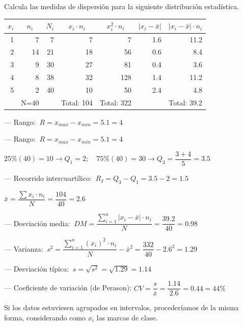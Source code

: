 \vspace{5mm}%
\begin{ejemplo}
\begin{ejre} Calcula las medidas de dispersión para la siguiente distribución estadística.
			
\begin{table}[H]
\centering
\begin{tabular}{r|r|r|r|r|r|r|}
\hline
\multicolumn{1}{|c|}{\textbf{$x_i$}} & \multicolumn{1}{c|}{\textbf{$n_i$}} & \multicolumn{1}{c|}{\textbf{$N_i$}} & \multicolumn{1}{c|}{\textbf{$x_i\cdot n_i$}} & \multicolumn{1}{c|}{\textbf{$x_i^2 \cdot n_i$}} & \multicolumn{1}{c|}{\textbf{$|x_i- \bar x|$}} & \multicolumn{1}{c|}{\textbf{$|x_i-\bar x| \cdot n_i$}} \\ \hline
\multicolumn{1}{|r|}{1} & 7 & 7 & 7 & 7 & 1.6 & 11.2 \\
\multicolumn{1}{|r|}{2} & 14 & 21 & 18 & 56 & 0.6 & 8.4 \\
\multicolumn{1}{|r|}{3} & 9 & 30 & 27 & 81 & 0.4 & 3.6 \\
\multicolumn{1}{|r|}{4} & 8 & 38 & 32 & 128 & 1.4 & 11.2 \\
\multicolumn{1}{|r|}{5} & 2 & 40 & 10 & 50 & 2.4 & 4.8 \\ \hline
 & \multicolumn{1}{c|}{N=40} &  & \multicolumn{1}{c|}{Total: 104} & \multicolumn{1}{c|}{Total: 322} &  & \multicolumn{1}{c|}{Total: 39.2} \\ \cline{2-2} \cline{4-5} \cline{7-7} 
\end{tabular}
\end{table}



--- Rango: $\ R=x_{max}-x_{min}=5.1=4$



--- Rango: $\ R=x_{max}-x_{min}=5.1=4$

$25\% (40)=10 \to Q_1=2; \quad 75\%(40)=30 \to Q_3=\dfrac{3+4}{5}=3.5$

--- Recorrido intercuartílico: $\ R_I=Q_3-Q_1=3.5-2=1.5$

$\bar x=\dfrac {\displaystyle \sum x_i \cdot n_i}{N}=\dfrac{104}{40}=2.6$

--- Desviación media: $\ DM  =  \dfrac { \displaystyle \sum_{i=1}^n |x_i-\bar x|\cdot n_i }{N}=\dfrac{39.2}{40}=0.98$ 

--- Varianza: $\ s^2 =\dfrac {\displaystyle \sum_{i=1}^n (x_i)^2\cdot n_i}{N}-{\bar {x}}^2=\dfrac{332}{40}-2.6^2=1.29$

--- Desviación típica: $\ s=\sqrt{s^2}=\sqrt{1.29}=1.14$

--- Coeficiente de variación (de Perason): $CV=\dfrac{s}{\bar x}=\dfrac{1.14}{2.6}=0.44=44 \%$

Si los datos estuviesen agrupados en intervalos, procederíamos de la misma forma, considerando como $x_i$ las marcas de clase.

\end{ejre}
\end{ejemplo}	
	
